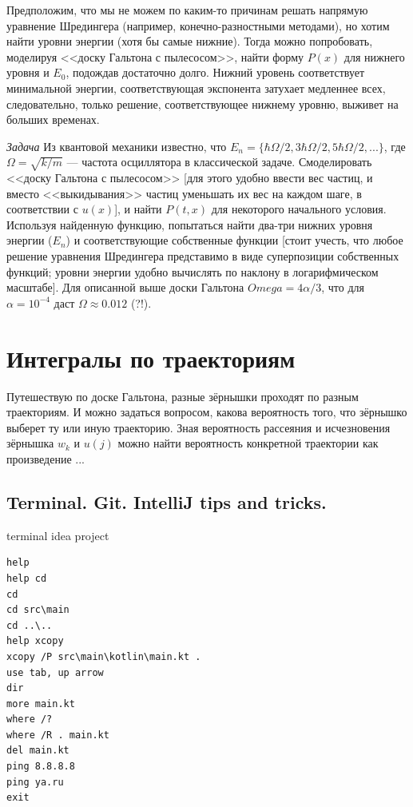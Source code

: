 \documentclass{book}
\begin{document}
Предположим, что мы не можем по каким-то причинам решать напрямую уравнение Шредингера (например,
конечно-разностными методами), но хотим найти уровни энергии (хотя бы самые нижние). Тогда можно
попробовать, моделируя <<доску Гальтона с пылесосом>>, найти форму $P(x)$ для нижнего уровня и $E_0$,
подождав достаточно долго. Нижний уровень соответствует минимальной энергии, соответствующая
экспонента затухает медленнее всех, следовательно, только решение, соответствующее нижнему уровню,
выживет на больших временах.

\textit{Задача}
Из квантовой механики известно, что $E_n = \{\hbar \Omega / 2, 3 \hbar \Omega / 2, 5 \hbar \Omega /
2, ...\}$, где $\Omega = \sqrt{k / m}$ --- частота осциллятора в классической задаче. Смоделировать
<<доску Гальтона с пылесосом>> [для этого удобно ввести вес частиц, и вместо <<выкидывания>> частиц
уменьшать их вес на каждом шаге, в соответствии с $u(x)$], и найти $P(t, x)$ для некоторого
начального условия.  Используя найденную функцию, попытаться найти два-три нижних уровня энергии
($E_n$) и соответствующие собственные функции [стоит учесть, что любое решение уравнения Шредингера
представимо в виде суперпозиции собственных функций; уровни энергии удобно вычислять по наклону в
логарифмическом масштабе]. Для описанной выше доски Гальтона $Omega = 4 \alpha / 3$, что для
$\alpha = 10^{-4}$ даст $\Omega \approx 0.012$ (?!).

\section{Интегралы по траекториям}

Путешествую по доске Гальтона, разные зёрнышки проходят по разным траекториям. И можно задаться
вопросом, какова вероятность того, что зёрнышко выберет ту или иную траекторию. Зная вероятность
рассеяния и исчезновения зёрнышка $w_k$ и $u(j)$ можно найти вероятность конкретной траектории как
произведение ...

\subsection{Terminal. Git. IntelliJ tips and tricks.}

terminal idea project
\begin{verbatim}
help
help cd
cd
cd src\main
cd ..\..
help xcopy
xcopy /P src\main\kotlin\main.kt .
use tab, up arrow
dir
more main.kt
where /?
where /R . main.kt
del main.kt
ping 8.8.8.8
ping ya.ru
exit
\end{verbatim}
\end{document}
